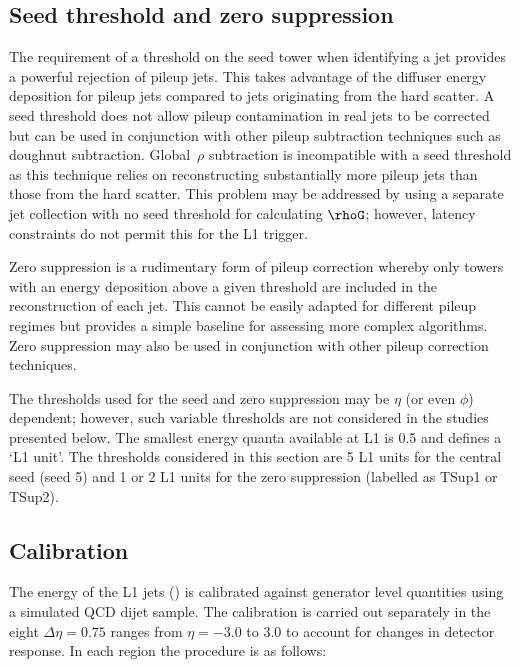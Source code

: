\subsection{Seed threshold and zero suppression}
\label{sec:seed_thresh}

The requirement of a threshold on the seed tower when identifying a jet
provides a powerful rejection of pileup jets. This takes advantage of the
diffuser energy deposition for pileup jets compared to jets originating from 
the hard scatter. A seed threshold does not allow pileup contamination in real jets to be corrected
but can be used in conjunction with other pileup subtraction techniques such as doughnut
subtraction. Global~$\rho$ subtraction is incompatible with a seed threshold as this technique relies
on reconstructing substantially more pileup jets than those from the hard scatter. 
This problem may be addressed by using a separate jet collection with no seed threshold
for calculating $\rhoG$; however, latency constraints do not permit this for the L1 trigger.

Zero suppression is a rudimentary form of pileup correction whereby only towers with
an energy deposition above a given threshold are included in the reconstruction of each jet.
This cannot be easily adapted for different pileup regimes but provides a simple baseline 
for assessing more complex algorithms. Zero suppression may also be used in conjunction
with other pileup correction techniques. 

The thresholds used for the seed and zero suppression may be $\eta$ (or even $\phi$) dependent; however,
such variable thresholds are not considered in the studies presented below. The smallest energy quanta
available at L1 is 0.5 \GeV and defines a `L1 unit'. The thresholds considered in this section are 5 L1 units
for the central seed (seed 5) and 1 or 2 L1 units for the zero suppression (labelled as TSup1 or TSup2).

\subsection{Calibration}
\label{sec:calib}
The energy of the L1 jets (\Lonept) is calibrated against generator level quantities using a simulated QCD dijet sample.
The calibration is carried out separately in the eight $\Delta\eta = 0.75$ ranges from $\eta=-3.0$ to $3.0$ 
to account for changes in detector response. In each region the procedure is as follows:

